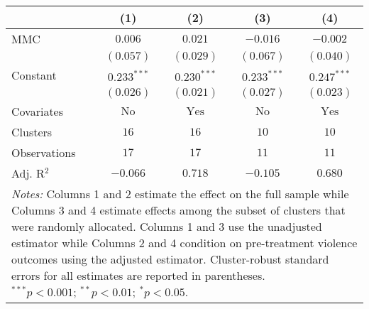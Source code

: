 
\begin{tabular}{l c c c c}
\toprule
 & (1) & (2) & (3) & (4) \\
\midrule
MMC          & $0.006$       & $0.021$        & $-0.016$      & $-0.002$       \\
             & $(0.057)$     & $(0.029)$      & $(0.067)$     & $(0.040)$      \\
Constant     & $0.233^{***}$ & $0.230^{***}$  & $0.233^{***}$ & $0.247^{***}$  \\
             & $(0.026)$     & $(0.021)$      & $(0.027)$     & $(0.023)$      \\
\midrule
Covariates   & $\textrm{No}$ & $\textrm{Yes}$ & $\textrm{No}$ & $\textrm{Yes}$ \\
Clusters     & $16$          & $16$           & $10$          & $10$           \\
Observations & $17$          & $17$           & $11$          & $11$           \\
Adj. R$^2$   & $-0.066$      & $0.718$        & $-0.105$      & $0.680$        \\
\bottomrule
\multicolumn{5}{l}{\scriptsize{\parbox{.5\linewidth}{\vspace{2pt} 
       \textit{Notes:} Columns 1 and 2 estimate the effect on the full sample while Columns 3 
       and 4 estimate effects among the subset of clusters that were randomly allocated.
       Columns 1 and 3 use the unadjusted estimator while Columns 2 and 4 condition on 
       pre-treatment violence outcomes using the adjusted estimator. Cluster-robust 
       standard errors for all estimates are reported in parentheses. \\ $^{***}p<0.001$; $^{**}p<0.01$; $^{*}p<0.05$.}}}
\end{tabular}
